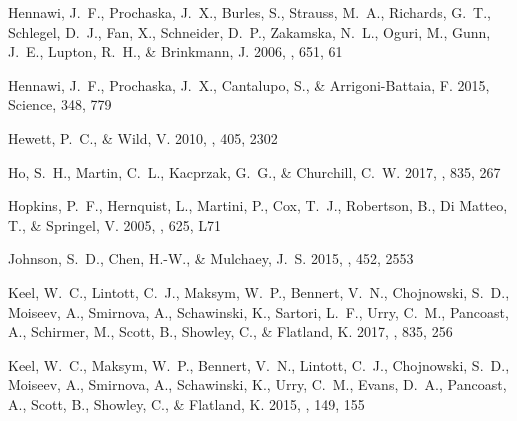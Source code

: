 \documentclass[iop]{emulateapj}
\begin{document}
{\begin{thebibliography}{52}
{Hennawi}, J.~F., {Prochaska}, J.~X., {Burles}, S., {Strauss}, M.~A.,
  {Richards}, G.~T., {Schlegel}, D.~J., {Fan}, X., {Schneider}, D.~P.,
  {Zakamska}, N.~L., {Oguri}, M., {Gunn}, J.~E., {Lupton}, R.~H., \&
  {Brinkmann}, J. 2006, \apj, 651, 61

{Hennawi}, J.~F., {Prochaska}, J.~X., {Cantalupo}, S., \& {Arrigoni-Battaia},
  F. 2015, Science, 348, 779

{Hewett}, P.~C., \& {Wild}, V. 2010, \mnras, 405, 2302

{Ho}, S.~H., {Martin}, C.~L., {Kacprzak}, G.~G., \& {Churchill}, C.~W. 2017,
  \apj, 835, 267

{Hopkins}, P.~F., {Hernquist}, L., {Martini}, P., {Cox}, T.~J., {Robertson},
  B., {Di Matteo}, T., \& {Springel}, V. 2005, \apjl, 625, L71

{Johnson}, S.~D., {Chen}, H.-W., \& {Mulchaey}, J.~S. 2015, \mnras, 452, 2553

{Keel}, W.~C., {Lintott}, C.~J., {Maksym}, W.~P., {Bennert}, V.~N.,
  {Chojnowski}, S.~D., {Moiseev}, A., {Smirnova}, A., {Schawinski}, K.,
  {Sartori}, L.~F., {Urry}, C.~M., {Pancoast}, A., {Schirmer}, M., {Scott}, B.,
  {Showley}, C., \& {Flatland}, K. 2017, \apj, 835, 256

{Keel}, W.~C., {Maksym}, W.~P., {Bennert}, V.~N., {Lintott}, C.~J.,
  {Chojnowski}, S.~D., {Moiseev}, A., {Smirnova}, A., {Schawinski}, K., {Urry},
  C.~M., {Evans}, D.~A., {Pancoast}, A., {Scott}, B., {Showley}, C., \&
  {Flatland}, K. 2015, \aj, 149, 155


\end{thebibliography}}
\end{document}
